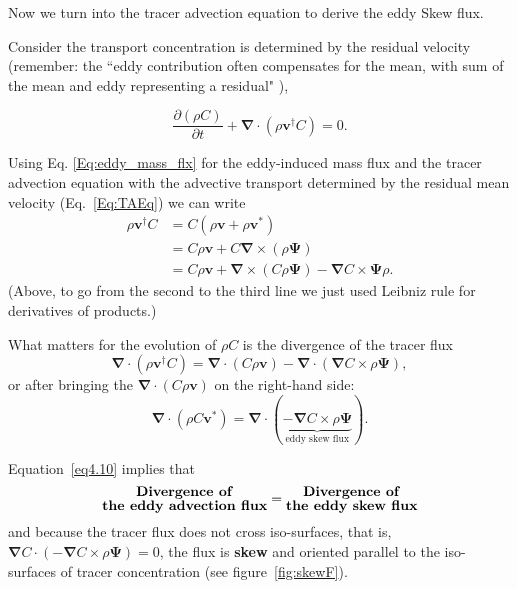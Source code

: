 Now we turn into the tracer advection equation to derive the eddy Skew flux. 

Consider the transport concentration is determined by the residual velocity (remember: the ``eddy contribution often compensates for the mean, with sum of the mean and eddy representing a residual" \citep{Griffies2019}),
 
 \begin{equation}
     \frac{\partial (\rho C)}{\partial t} + \boldsymbol{\nabla} \cdot (\rho \boldsymbol{v}^\dagger C) = 0.
     \label{Eq:TAEq}
 \end{equation}
 
 Using Eq. \eqref{Eq:eddy_mass_flx} for the eddy-induced mass flux and the tracer advection equation with the advective transport determined by the residual mean velocity (Eq.~\eqref{Eq:TAEq}) we can write 
 \begin{align}
      \rho \boldsymbol{v}^\dagger C &= C(\rho \boldsymbol{v} + \rho \boldsymbol{v}^*) \nonumber\\
    																& = C\rho \boldsymbol{v} + C \boldsymbol{\nabla} \times (\rho \boldsymbol{\Psi}) \nonumber\\
    																&= C\rho \boldsymbol{v} + \boldsymbol{\nabla} \times (C \rho \boldsymbol{\Psi}) - \boldsymbol{\nabla} C \times \boldsymbol{\Psi} \rho.
 \end{align}	
 (Above, to go from the second to the third line we just used Leibniz rule for derivatives of products.)

 What matters for the evolution of $\rho C$ is the divergence of the tracer flux
  \begin{equation}
      \boldsymbol{\nabla} \cdot (\rho \boldsymbol{v}^\dagger C) = \boldsymbol{\nabla} \cdot (C\rho \boldsymbol{v}) - \boldsymbol{\nabla} \cdot (\boldsymbol{\nabla} C \times \rho \boldsymbol{\Psi}),
  \end{equation}
  or after bringing the $\boldsymbol{\nabla} \cdot (C\rho \boldsymbol{v})$ on the right-hand side:
  \begin{equation}
      \boldsymbol{\nabla} \cdot (\rho C \boldsymbol{v}^*) =  \boldsymbol{\nabla} \cdot (\underbrace{-\boldsymbol{\nabla} C \times \rho \boldsymbol{\Psi}}_{\text{eddy skew flux}}). \label{eq4.10}
  \end{equation}

Equation~\eqref{eq4.10} implies that 
\begin{equation}
      \substack{\text{\normalsize\textbf{Divergence of}}\\\text{\normalsize\textbf{the eddy advection flux}}} =  
			\substack{\text{\normalsize\textbf{Divergence of}}\\\text{\normalsize\textbf{the eddy skew flux}}}
\end{equation}
 and because the tracer flux does not cross iso-surfaces, that is, $\boldsymbol{\nabla} C \cdot (-\boldsymbol{\nabla} C \times \rho \boldsymbol{\Psi}) = 0$, the flux is \textbf{skew} and oriented parallel to the iso-surfaces of tracer concentration (see figure~\ref{fig:skewF}).


